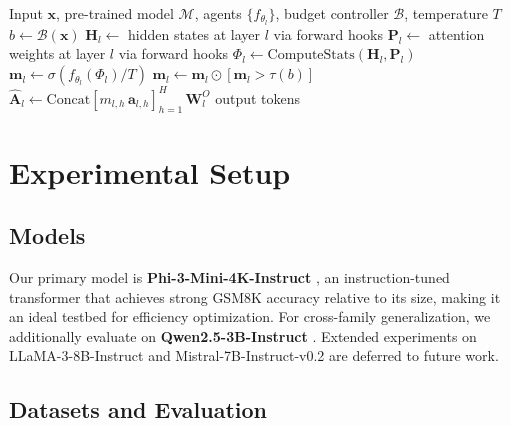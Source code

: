 \documentclass{article}
\newcommand{\system}{\textsc{adapt}}
\begin{document}
\begin{algorithm}[t]
\caption{\system{} Dynamic Pruning Forward Pass}
\label{alg:forward}
\begin{algorithmic}[1]
\REQUIRE Input $\mathbf{x}$, pre-trained model $\mathcal{M}$, agents
         $\{f_{\theta_l}\}$, budget controller $\mathcal{B}$, temperature $T$
\STATE $b \leftarrow \mathcal{B}(\mathbf{x})$ 
  \STATE $\mathbf{H}_l \leftarrow$ hidden states at layer $l$ via forward hooks
  \STATE $\mathbf{P}_l \leftarrow$ attention weights at layer $l$ via forward hooks
  \STATE $\Phi_l \leftarrow \text{ComputeStats}(\mathbf{H}_l, \mathbf{P}_l)$
  \STATE $\mathbf{m}_l \leftarrow \sigma(f_{\theta_l}(\Phi_l) / T)$
  \STATE $\mathbf{m}_l \leftarrow \mathbf{m}_l \odot [\mathbf{m}_l > \tau(b)]$
  \STATE $\hat{\mathbf{A}}_l \leftarrow
         \text{Concat}[m_{l,h}\,\mathbf{a}_{l,h}]_{h=1}^{H}\,\mathbf{W}^O_l$
\ENDFOR
\RETURN output tokens
\end{algorithmic}
\end{algorithm}

\section{Experimental Setup}
\label{sec:experiments}

\subsection{Models}
\label{sec:exp_models}

Our primary model is \textbf{Phi-3-Mini-4K-Instruct} \citep{abdin2024phi3}, an
instruction-tuned transformer that achieves strong GSM8K accuracy relative to its size,
making it an ideal testbed for efficiency optimization. For cross-family generalization, we
additionally evaluate on \textbf{Qwen2.5-3B-Instruct} \citep{qwen2025qwen25}. Extended
experiments on LLaMA-3-8B-Instruct \citep{touvron2023llama} and Mistral-7B-Instruct-v0.2
\citep{jiang2023mistral} are deferred to future work.

\subsection{Datasets and Evaluation}
\label{sec:exp_data}
\end{document}
